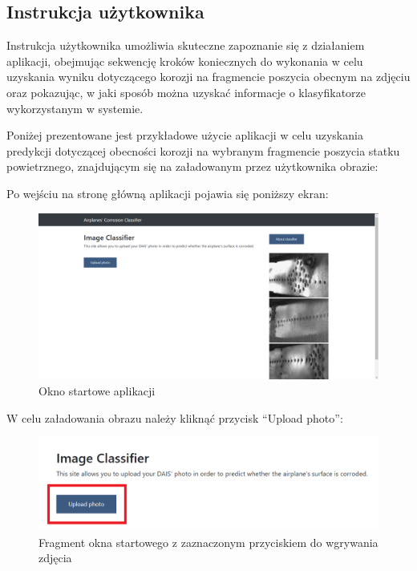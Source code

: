 \documentclass[polish,12pt]{aghthesis}
\begin{document}
\subsection{Instrukcja użytkownika}
\par Instrukcja użytkownika umożliwia skuteczne zapoznanie się z działaniem aplikacji, obejmując sekwencję kroków koniecznych do wykonania w celu uzyskania wyniku dotyczącego korozji na fragmencie poszycia obecnym na zdjęciu oraz pokazując, w jaki sposób można uzyskać informacje o klasyfikatorze wykorzystanym w systemie.
\vspace{3mm}
\par Poniżej prezentowane jest przykładowe użycie aplikacji w celu uzyskania predykcji dotyczącej obecności korozji na wybranym fragmencie poszycia statku powietrznego, znajdującym się na załadowanym przez użytkownika obrazie:
\vspace{3mm}
\par\noindent Po wejściu na stronę główną aplikacji pojawia się poniższy ekran:
\begin{figure}[H]%
\centering
\includegraphics[width=17cm]{images/oknoStartowe.PNG}
\caption{Okno startowe aplikacji}
\end{figure}

\newpage
\noindent W celu załadowania obrazu należy kliknąć przycisk ``Upload photo'':
\begin{figure}[H]%
\centering
\includegraphics[width=14cm]{images/uploadPhoto.PNG}
\caption{Fragment okna startowego z zaznaczonym przyciskiem do wgrywania zdjęcia}
\end{figure}
\end{document}
